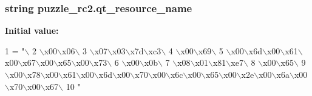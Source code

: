 \subsubsection[{qt\+\_\+resource\+\_\+name}]{\setlength{\rightskip}{0pt plus 5cm}string puzzle\+\_\+rc2.\+qt\+\_\+resource\+\_\+name}\label{namespacepuzzle__rc2_ad271e273fc664da35fd817802936bc53}
{\bfseries Initial value\+:}
\begin{DoxyCode}
1 = \textcolor{stringliteral}{"\(\backslash\)}
2 \textcolor{stringliteral}{\(\backslash\)x00\(\backslash\)x06\(\backslash\)}
3 \textcolor{stringliteral}{\(\backslash\)x07\(\backslash\)x03\(\backslash\)x7d\(\backslash\)xc3\(\backslash\)}
4 \textcolor{stringliteral}{\(\backslash\)x00\(\backslash\)x69\(\backslash\)}
5 \textcolor{stringliteral}{\(\backslash\)x00\(\backslash\)x6d\(\backslash\)x00\(\backslash\)x61\(\backslash\)x00\(\backslash\)x67\(\backslash\)x00\(\backslash\)x65\(\backslash\)x00\(\backslash\)x73\(\backslash\)}
6 \textcolor{stringliteral}{\(\backslash\)x00\(\backslash\)x0b\(\backslash\)}
7 \textcolor{stringliteral}{\(\backslash\)x08\(\backslash\)x01\(\backslash\)x81\(\backslash\)xe7\(\backslash\)}
8 \textcolor{stringliteral}{\(\backslash\)x00\(\backslash\)x65\(\backslash\)}
9 \textcolor{stringliteral}{\(\backslash\)x00\(\backslash\)x78\(\backslash\)x00\(\backslash\)x61\(\backslash\)x00\(\backslash\)x6d\(\backslash\)x00\(\backslash\)x70\(\backslash\)x00\(\backslash\)x6c\(\backslash\)x00\(\backslash\)x65\(\backslash\)x00\(\backslash\)x2e\(\backslash\)x00\(\backslash\)x6a\(\backslash\)x00\(\backslash\)x70\(\backslash\)x00\(\backslash\)x67\(\backslash\)}
10 \textcolor{stringliteral}{"}
\end{DoxyCode}
\hypertarget{namespacepuzzle__rc2_a47a71ee6a62e6656c84a56157fb2cf6b}{}

